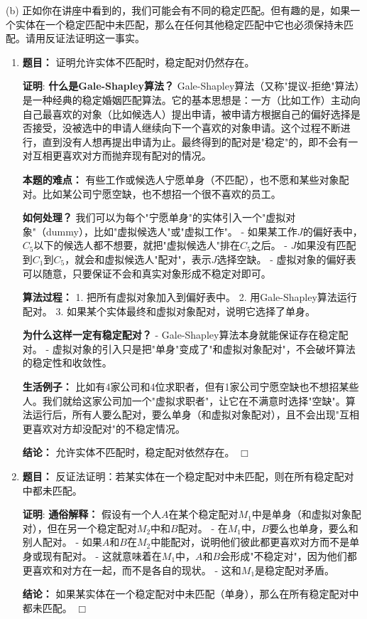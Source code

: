 \documentclass[11pt]{article}
\newenvironment{qparts}{\begin{enumerate}[{(}a{)}]}{\end{enumerate}}
\def\endproofmark{$\Box$}
\newenvironment{proof}{\par{\bf 证明}:}{\endproofmark\smallskip}
\begin{document}
(b) 正如你在讲座中看到的，我们可能会有不同的稳定匹配。但有趣的是，如果一个实体在一个稳定匹配中未匹配，那么在任何其他稳定匹配中它也必须保持未匹配。请用反证法证明这一事实。

\begin{qparts}
\item \textbf{题目：} 证明允许实体不匹配时，稳定配对仍然存在。
\begin{proof}
\textbf{什么是Gale-Shapley算法？}  
Gale-Shapley算法（又称"提议-拒绝"算法）是一种经典的稳定婚姻匹配算法。它的基本思想是：一方（比如工作）主动向自己最喜欢的对象（比如候选人）提出申请，被申请方根据自己的偏好选择是否接受，没被选中的申请人继续向下一个喜欢的对象申请。这个过程不断进行，直到没有人想再提出申请为止。最终得到的配对是"稳定"的，即不会有一对互相更喜欢对方而抛弃现有配对的情况。

\textbf{本题的难点：}  
有些工作或候选人宁愿单身（不匹配），也不愿和某些对象配对。比如某公司宁愿空缺，也不想招一个很不喜欢的员工。

\textbf{如何处理？}  
我们可以为每个"宁愿单身"的实体引入一个"虚拟对象"（dummy），比如"虚拟候选人"或"虚拟工作"。  
- 如果某工作$J$的偏好表中，$C_5$以下的候选人都不想要，就把"虚拟候选人"排在$C_5$之后。
- $J$如果没有匹配到$C_1$到$C_5$，就会和虚拟候选人"配对"，表示$J$选择空缺。
- 虚拟对象的偏好表可以随意，只要保证不会和真实对象形成不稳定对即可。

\textbf{算法过程：}  
1. 把所有虚拟对象加入到偏好表中。
2. 用Gale-Shapley算法运行配对。
3. 如果某个实体最终和虚拟对象配对，说明它选择了单身。

\textbf{为什么这样一定有稳定配对？}  
- Gale-Shapley算法本身就能保证存在稳定配对。
- 虚拟对象的引入只是把"单身"变成了"和虚拟对象配对"，不会破坏算法的稳定性和收敛性。

\textbf{生活例子：}  
比如有4家公司和4位求职者，但有1家公司宁愿空缺也不想招某些人。我们就给这家公司加一个"虚拟求职者"，让它在不满意时选择"空缺"。算法运行后，所有人要么配对，要么单身（和虚拟对象配对），且不会出现"互相更喜欢对方却没配对"的不稳定情况。

\textbf{结论：}  
允许实体不匹配时，稳定配对依然存在。
\end{proof}

\item \textbf{题目：} 反证法证明：若某实体在一个稳定配对中未匹配，则在所有稳定配对中都未匹配。
\begin{proof}
\textbf{通俗解释：}  
假设有一个人$A$在某个稳定配对$M_1$中是单身（和虚拟对象配对），但在另一个稳定配对$M_2$中和$B$配对。  
- 在$M_1$中，$B$要么也单身，要么和别人配对。
- 如果$A$和$B$在$M_2$中能配对，说明他们彼此都更喜欢对方而不是单身或现有配对。
- 这就意味着在$M_1$中，$A$和$B$会形成"不稳定对"，因为他们都更喜欢和对方在一起，而不是各自的现状。
- 这和$M_1$是稳定配对矛盾。

\textbf{结论：}  
如果某实体在一个稳定配对中未匹配（单身），那么在所有稳定配对中都未匹配。
\end{proof}
\end{qparts}
\end{document}
